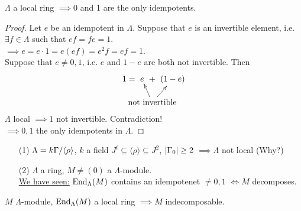\begin{prop}\label{prop:35}
$\Lambda$ a local ring $\implies 0$ and 1 are the only idempotents.
\begin{proof}
  Let $e$ be an idempotent in $\Lambda$. Suppose that $e$ is an invertible element, i.e. $\exists f \in \Lambda$ such that $ef = fe = 1$.\\
  $\implies e = e\cdot 1 = e(ef) = e^2f = ef = 1$.\\
  Suppose that $e \neq 0,1$, i.e. $e$ and $1-e$ are both not
  invertible. Then \[\xy\xymatrix"eq"@C-2pc{1 = & e &+ & (1-e)}
  \POS+(10, -10) \xymatrix{\text{not invertible} \ar["eq"r]
    \ar["eq"rrr]}
\endxy\]
$\Lambda$ local $\implies 1$ not invertible. Contradiction!\\
$\implies 0,1$ the only idempotents in $\Lambda$.
\end{proof}
\end{prop}

\begin{note}
\begin{enumerate}
\item[(1)] $\Lambda = k\Gamma / \langle \rho \rangle$, $k$ a field $J^t \subseteq \langle \rho \rangle \subseteq J^2$, $|\Gamma_0| \geq 2$ $\implies \Lambda$ not local (Why?)
\item[(2)] $\Lambda$ a ring, $M \neq (0)$ a $\Lambda$-module.\\
\underline{We have seen:} $\operatorname{End}_\Lambda(M)$ contains an idempotenet $\neq 0,1$ $\iff M$ decomposes.
\end{enumerate}
\end{note}


\begin{cor}
\label{cor:local_imply_indec}
$M$ $\Lambda$-module, $\operatorname{End}_\Lambda(M)$ a local ring $\implies M$ indecomposable.
\end{cor}

